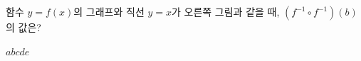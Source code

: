 \hspace*{2mm}\begin{minipage}[t]{\dimexpr\linewidth-2mm\relax}\vspace{0pt}
\noindent\begin{minipage}[t]{0.58\linewidth}\vspace{0pt}\raggedright 함수 $y=f(x)$의 그래프와 직선 $y=x$가 오른쪽 그림과 같을 때, $(f^{-1}\circ f^{-1})(b)$의 값은? \end{minipage}\hfill\begin{minipage}[t]{0.4\linewidth}\vspace{0pt}\centering \resizebox{\ifdim\width>\linewidth\linewidth\else\width\fi}{!}{}\end{minipage}\par
\begin{choicesii}{$a$}{$b$}{$c$}{$d$}{$e$}\end{choicesii}\end{minipage}
